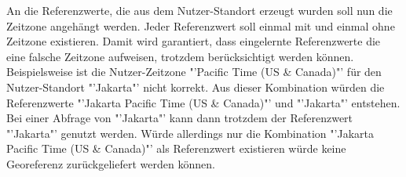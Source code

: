 					An die Referenzwerte, die aus dem Nutzer-Standort erzeugt wurden soll nun die Zeitzone angehängt werden.
					Jeder Referenzwert soll einmal mit und einmal ohne Zeitzone existieren. 
					Damit wird garantiert, dass eingelernte Referenzwerte die eine falsche Zeitzone aufweisen, trotzdem berücksichtigt werden können. 
					Beispielsweise ist die Nutzer-Zeitzone "'Pacific Time (US \& Canada)"' für den Nutzer-Standort "'Jakarta"' nicht korrekt.
					Aus dieser Kombination würden die Referenzwerte "'Jakarta Pacific Time (US \& Canada)"' und "'Jakarta"' entstehen. 
					Bei einer Abfrage von "'Jakarta"' kann dann trotzdem der Referenzwert "'Jakarta"' genutzt werden. 
					Würde allerdings nur die Kombination "'Jakarta Pacific Time (US \& Canada)"' als Referenzwert existieren würde keine Georeferenz zurückgeliefert werden können.

